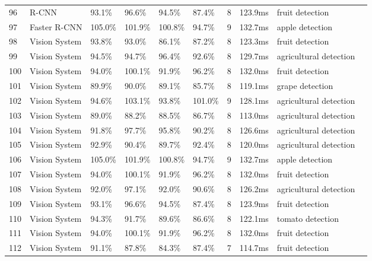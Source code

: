 \begin{table*}[htbp]
\begin{tabular}{p{}p{}p{}p{}p{}p{}p{}p{}p{}p{}}
 96 & R-CNN & 93.1\% & 96.6\% & 94.5\% & 87.4\% & 8 & 123.9ms & fruit detection & \cite{yu2019fruit} \\
 97 & Faster R-CNN & 105.0\% & 101.9\% & 100.8\% & 94.7\% & 9 & 132.7ms & apple detection & \cite{gao2020multi} \\
 98 & Vision System & 93.8\% & 93.0\% & 86.1\% & 87.2\% & 8 & 123.3ms & fruit detection & \cite{rahnemoonfar2017deep} \\
 99 & Vision System & 94.5\% & 94.7\% & 96.4\% & 92.6\% & 8 & 129.7ms & agricultural detection & \cite{bac2017performance} \\
 100 & Vision System & 94.0\% & 100.1\% & 91.9\% & 96.2\% & 8 & 132.0ms & fruit detection & \cite{li2020detection} \\
 101 & Vision System & 89.9\% & 90.0\% & 89.1\% & 85.7\% & 8 & 119.1ms & grape detection & \cite{luo2018vision} \\
 102 & Vision System & 94.6\% & 103.1\% & 93.8\% & 101.0\% & 9 & 128.1ms & agricultural detection & \cite{yu2020real} \\
 103 & Vision System & 89.0\% & 88.2\% & 88.5\% & 86.7\% & 8 & 113.0ms & agricultural detection & \cite{bac2014stem} \\
 104 & Vision System & 91.8\% & 97.7\% & 95.8\% & 90.2\% & 8 & 126.6ms & agricultural detection & \cite{lin2019guava} \\
 105 & Vision System & 92.9\% & 90.4\% & 89.7\% & 92.4\% & 8 & 120.0ms & agricultural detection & \cite{mendes2016vine} \\
 106 & Vision System & 105.0\% & 101.9\% & 100.8\% & 94.7\% & 9 & 132.7ms & apple detection & \cite{kang2020fruit} \\
 107 & Vision System & 94.0\% & 100.1\% & 91.9\% & 96.2\% & 8 & 132.0ms & fruit detection & \cite{lin2020color} \\
 108 & Vision System & 92.0\% & 97.1\% & 92.0\% & 90.6\% & 8 & 126.2ms & agricultural detection & \cite{barth2018data} \\
 109 & Vision System & 93.1\% & 96.6\% & 94.5\% & 87.4\% & 8 & 123.9ms & fruit detection & \cite{bresilla2019single} \\
 110 & Vision System & 94.3\% & 91.7\% & 89.6\% & 86.6\% & 8 & 122.1ms & tomato detection & \cite{zhao2016detecting} \\
 111 & Vision System & 94.0\% & 100.1\% & 91.9\% & 96.2\% & 8 & 132.0ms & fruit detection & \cite{lin2020fruit} \\
 112 & Vision System & 91.1\% & 87.8\% & 84.3\% & 87.4\% & 7 & 114.7ms & fruit detection & \cite{wei2014automatic} \\

\end{tabular}
\end{table*}
